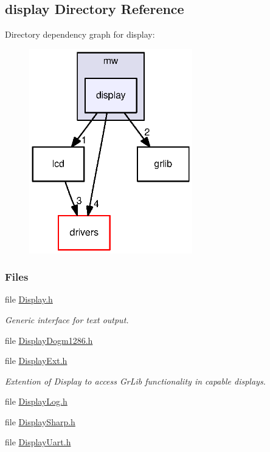 \subsection{display Directory Reference}
\label{dir_5191fdcfa732a7ed0729ace242509823}
Directory dependency graph for display\+:
\nopagebreak
\begin{figure}[H]
\begin{center}
\leavevmode
\includegraphics[width=201pt]{dir_5191fdcfa732a7ed0729ace242509823_dep}
\end{center}
\end{figure}
\subsubsection*{Files}
\begin{DoxyCompactItemize}
\item 
file \hyperlink{_display_8h}{Display.\+h}
\begin{DoxyCompactList}\small\item\em Generic interface for text output. \end{DoxyCompactList}\item 
file \hyperlink{_display_dogm1286_8h}{Display\+Dogm1286.\+h}
\item 
file \hyperlink{_display_ext_8h}{Display\+Ext.\+h}
\begin{DoxyCompactList}\small\item\em Extention of Display to access Gr\+Lib functionality in capable displays. \end{DoxyCompactList}\item 
file \hyperlink{_display_log_8h}{Display\+Log.\+h}
\item 
file \hyperlink{_display_sharp_8h}{Display\+Sharp.\+h}
\item 
file \hyperlink{_display_uart_8h}{Display\+Uart.\+h}
\end{DoxyCompactItemize}
